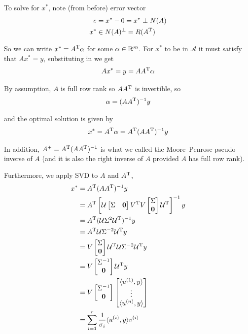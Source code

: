 To solve for $x^*$, note (from before) error vector 
\begin{align*}
e &= x^* - 0 = x^* \perp N(A)\\
x^* &\in N(A)^{\perp} = R(A^{{\rm T}})
\end{align*}

So we can write $x^* = A^{{\rm T}}\alpha$ for some $\alpha \in \mathbb{R}^m$. For $x^*$ to be in $\mathcal{A}$ it must satisfy that $Ax^* = y$, substituting in we get 
\begin{equation*}
Ax^* = y= AA^{{\rm T}}\alpha
\end{equation*}

By assumption, $A$ is full row rank so $AA^{{\rm T}}$ is invertible, so 
$$\alpha = (AA^{{\rm T}})^{-1}y$$

and the optimal solution is given by
$$x^* = A^{{\rm T}} \alpha = A^{{\rm T}}(AA^{{\rm T}})^{-1}y$$

In addition, $A^{+} =A^{{\rm T}}(AA^{{\rm T}})^{-1}$ is  what we called the Moore–Penrose pseudo inverse of $A$ (and it is also the right inverse of $A$ provided $A$ has full row rank).

Furthermore, we apply SVD to $A$ and $A^{{\rm T}}$,
\begin{align*}
x^* &= A^{{\rm T}}(AA^{{\rm T}})^{-1}y\\
&= A^{{\rm T}}\left[\mathcal{U}
\begin{bmatrix}
\Sigma & \mathbf{0}
\end{bmatrix}
V^{{\rm T}}V
\begin{bmatrix}
\Sigma\\
\mathbf{0}
\end{bmatrix}
\mathcal{U}^{{\rm T}}\right]^{-1}y\\
&= A^{{\rm T}}(\mathcal{U}\Sigma^2\mathcal{U}^{{\rm T}})^{-1}y\\
&= A^{{\rm T}}\mathcal{U}\Sigma^{-2}\mathcal{U}^{{\rm T}}y\\
&= V
\begin{bmatrix}
\Sigma\\
\mathbf{0}
\end{bmatrix}
\mathcal{U}^{{\rm T}}\mathcal{U}\Sigma^{-2}\mathcal{U}^{{\rm T}}y\\
&=V
\begin{bmatrix}
\Sigma^{-1} \\
\mathbf{0}
\end{bmatrix}
\mathcal{U}^{{\rm T}}y\\
&= V
\begin{bmatrix}
\Sigma^{-1}\\
\mathbf{0}
\end{bmatrix}
\begin{bmatrix}
\langle u^{(1)}, y\rangle\\
\vdots\\
\langle u^{(n)}, y\rangle
\end{bmatrix}\\
&= \sum^r_{i=1}\frac{1}{\sigma_i}\langle u^{(i)}, y\rangle v^{(i)}
\end{align*}





